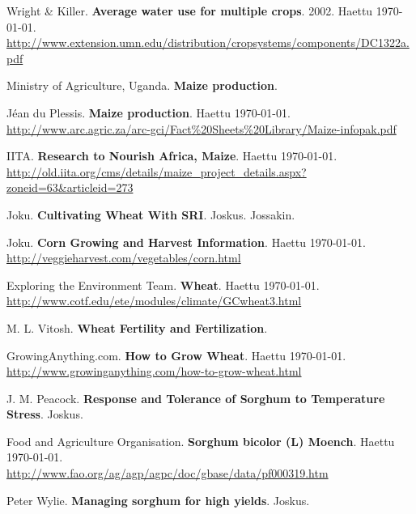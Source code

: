\documentclass[12pt]{scrreprt}
\renewcommand\emph{\textbf}
\begin{document}
  \begin{thebibliography}{9}

    Wright \& Killer.
    \emph{Average water use for multiple crops}.
    2002.
    Haettu \today. \\
    \url{http://www.extension.umn.edu/distribution/cropsystems/components/DC1322a.pdf}

    Ministry of Agriculture, Uganda.
    \emph{Maize production}.

    Jéan du Plessis.
    \emph{Maize production}.
    Haettu \today. \\
    \url{http://www.arc.agric.za/arc-gci/Fact%20Sheets%20Library/Maize-infopak.pdf}

    IITA.
    \emph{Research to Nourish Africa, Maize}.
    Haettu \today. \\
    \url{http://old.iita.org/cms/details/maize_project_details.aspx?zoneid=63&articleid=273}

    Joku.
    \emph{Cultivating Wheat With SRI}.
    Joskus.
    Jossakin.

    Joku.
    \emph{Corn Growing and Harvest Information}.
    Haettu \today. \\
    \url{http://veggieharvest.com/vegetables/corn.html}

    Exploring the Environment Team.
    \emph{Wheat}.
    Haettu \today. \\
    \url{http://www.cotf.edu/ete/modules/climate/GCwheat3.html}

    M. L. Vitosh.
    \emph{Wheat Fertility and Fertilization}.

    GrowingAnything.com.
    \emph{How to Grow Wheat}.
    Haettu \today. \\
    \url{http://www.growinganything.com/how-to-grow-wheat.html}
        
    J. M. Peacock.
    \emph{Response and Tolerance of Sorghum to Temperature Stress}.
    Joskus.

    Food and Agriculture Organisation.
    \emph{Sorghum bicolor (L) Moench}.
    Haettu \today. \\
    \url{http://www.fao.org/ag/agp/agpc/doc/gbase/data/pf000319.htm}

    Peter Wylie.
    \emph{Managing sorghum for high yields}.
    Joskus.

  \end{thebibliography}
\end{document}
